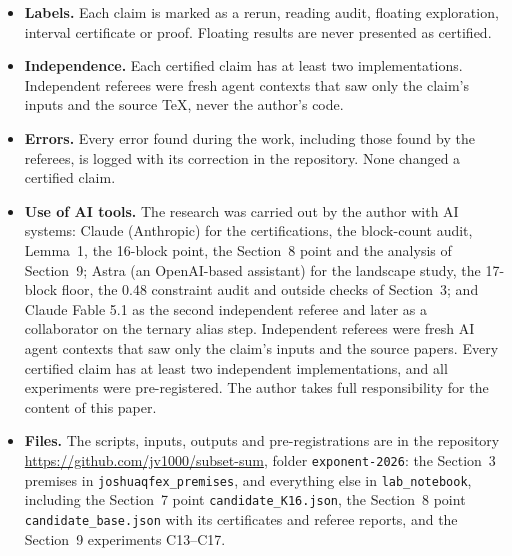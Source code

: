\documentclass[11pt]{article}
\theoremstyle{plain}
\begin{document}
\begin{itemize}
\item \textbf{Labels.} Each claim is marked as a rerun, reading audit, floating exploration, interval certificate or proof. Floating results are never presented as certified.
\item \textbf{Independence.} Each certified claim has at least two implementations. Independent referees were fresh agent contexts that saw only the claim's inputs and the source TeX, never the author's code.
\item \textbf{Errors.} Every error found during the work, including those found by the referees, is logged with its correction in the repository. None changed a certified claim.
\item \textbf{Use of AI tools.} The research was carried out by the author with AI systems: Claude (Anthropic) for the certifications, the block-count audit, Lemma~1, the 16-block point, the Section~8 point and the analysis of Section~9; Astra (an OpenAI-based assistant) for the landscape study, the 17-block floor, the 0.48 constraint audit and outside checks of Section~3; and Claude Fable 5.1 as the second independent referee and later as a collaborator on the ternary alias step. Independent referees were fresh AI agent contexts that saw only the claim's inputs and the source papers. Every certified claim has at least two independent implementations, and all experiments were pre-registered. The author takes full responsibility for the content of this paper.
\item \textbf{Files.} The scripts, inputs, outputs and pre-registrations are in the repository \url{https://github.com/jv1000/subset-sum}, folder \texttt{exponent-2026}: the Section~3 premises in \texttt{joshuaqfex\_premises}, and everything else in \texttt{lab\_notebook}, including the Section~7 point \texttt{candidate\_K16.json}, the Section~8 point \texttt{candidate\_base.json} with its certificates and referee reports, and the Section~9 experiments C13--C17.
\end{itemize}
\end{document}
